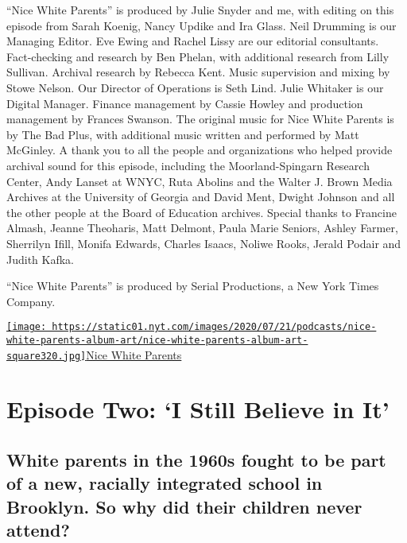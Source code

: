 ``Nice White Parents'' is produced by Julie Snyder and me, with editing
on this episode from Sarah Koenig, Nancy Updike and Ira Glass. Neil
Drumming is our Managing Editor. Eve Ewing and Rachel Lissy are our
editorial consultants. Fact-checking and research by Ben Phelan, with
additional research from Lilly Sullivan. Archival research by Rebecca
Kent. Music supervision and mixing by Stowe Nelson. Our Director of
Operations is Seth Lind. Julie Whitaker is our Digital Manager. Finance
management by Cassie Howley and production management by Frances
Swanson. The original music for Nice White Parents is by The Bad Plus,
with additional music written and performed by Matt McGinley. A thank
you to all the people and organizations who helped provide archival
sound for this episode, including the Moorland-Spingarn Research Center,
Andy Lanset at WNYC, Ruta Abolins and the Walter J. Brown Media Archives
at the University of Georgia and David Ment, Dwight Johnson and all the
other people at the Board of Education archives. Special thanks to
Francine Almash, Jeanne Theoharis, Matt Delmont, Paula Marie Seniors,
Ashley Farmer, Sherrilyn Ifill, Monifa Edwards, Charles Isaacs, Noliwe
Rooks, Jerald Podair and Judith Kafka.

``Nice White Parents'' is produced by Serial Productions, a New York
Times Company.

\href{https://www.nytimes.com/column/nice-white-parents}{\texttt{[image: https://static01.nyt.com/images/2020/07/21/podcasts/nice-white-parents-album-art/nice-white-parents-album-art-square320.jpg]}Nice
White Parents}

\hypertarget{episode-two-i-still-believe-in-it-1}{%
\section{Episode Two: `I Still Believe in
It'}\label{episode-two-i-still-believe-in-it-1}}

\hypertarget{white-parents-in-the-1960s-fought-to-be-part-of-a-new-racially-integrated-school-in-brooklyn-so-why-did-their-children-never-attend-1}{%
\subsection{White parents in the 1960s fought to be part of a new,
racially integrated school in Brooklyn. So why did their children never
attend?}\label{white-parents-in-the-1960s-fought-to-be-part-of-a-new-racially-integrated-school-in-brooklyn-so-why-did-their-children-never-attend-1}}

